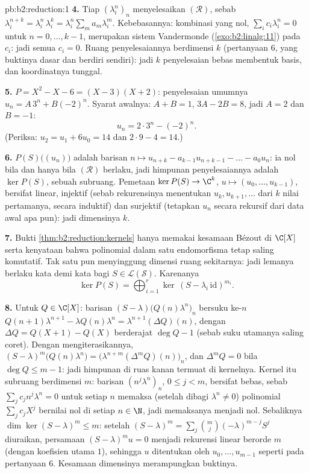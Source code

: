 \begin{solution}{pb:b2:reduction:1}
\textbf{4.} Tiap $(\lambda_i^n)_n$ menyelesaikan $(\mathcal R)$, sebab
$\lambda_i^{n+k} = \lambda_i^n\,\lambda_i^k =
\lambda_i^n\sum_m a_m\lambda_i^m$. Kebebasannya: kombinasi yang nol,
$\sum_i c_i\lambda_i^n = 0$ untuk $n = 0, \dots, k-1$,
merupakan sistem Vandermonde (\cref{exo:b2:linalg:11}) pada $c_i$:
jadi semua $c_i = 0$. Ruang penyelesaiannya berdimensi $k$ (pertanyaan 6,
yang buktinya dasar dan berdiri sendiri): jadi $k$ penyelesaian bebas
membentuk basis, dan koordinatnya tunggal.

\textbf{5.} $P = X^2 - X - 6 = (X - 3)(X + 2)$: penyelesaian umumnya
$u_n = A\,3^n + B(-2)^n$. Syarat awalnya: $A + B = 1$, $3A -
2B = 8$, jadi $A = 2$ dan $B = -1$:
\[
u_n = 2\cdot 3^n - (-2)^n .
\]
(Periksa: $u_2 = u_1 + 6u_0 = 14$ dan $2\cdot9 - 4 = 14$.)

\textbf{6.} $P(S)\bigl((u_n)\bigr)$ adalah barisan $n \mapsto
u_{n+k} - a_{k-1}u_{n+k-1} - \dots - a_0u_n$: ia nol bila dan hanya bila
$(\mathcal R)$ berlaku, jadi himpunan penyelesaiannya adalah $\ker P(S)$,
sebuah subruang. Pemetaan $\ker P(S) \to \C^k$, $u \mapsto (u_0, \dots,
u_{k-1})$, bersifat linear, injektif (sebab rekurensinya menentukan
$u_{k}, u_{k+1}, \dots$ dari $k$ nilai pertamanya, secara induktif)
dan surjektif (tetapkan $u_n$ secara rekursif dari data awal apa pun):
jadi dimensinya $k$.

\textbf{7.} Bukti \cref{thm:b2:reduction:kernels} hanya memakai
kesamaan Bézout di $\C[X]$ serta kenyataan bahwa
polinomial dalam satu endomorfisma tetap saling komutatif. Tak satu pun
menyinggung dimensi ruang sekitarnya: jadi lemanya berlaku kata demi
kata bagi $S \in \mathcal{L}(\mathcal{S})$. Karenanya
\[
\ker P(S) = \bigoplus_{i=1}^{r}
\ker\,(S - \lambda_i\,\mathrm{id})^{m_i}.
\]

\textbf{8.} Untuk $Q \in \C[X]$: barisan $(S -
\lambda)\bigl(Q(n)\lambda^n\bigr)_n$ bersuku ke-$n$
$Q(n{+}1)\lambda^{n+1} - \lambda Q(n)\lambda^n =
\lambda^{n+1}(\Delta Q)(n)$, dengan $\Delta Q = Q(X{+}1) - Q(X)$
berderajat $\deg Q - 1$ (sebab suku utamanya saling coret). Dengan
mengiterasikannya, $(S - \lambda)^m\bigl(Q(n)\lambda^n\bigr) =
\bigl(\lambda^{n+m}(\Delta^m Q)(n)\bigr)_n$, dan $\Delta^m Q = 0$
bila $\deg Q \leq m - 1$: jadi himpunan di ruas kanan termuat di
kernelnya. Kernel itu subruang berdimensi $m$: barisan
$(n^j\lambda^n)_n$, $0 \leq j < m$, bersifat bebas, sebab
$\sum_j c_j n^j\lambda^n = 0$ untuk setiap $n$ memaksa (setelah dibagi
$\lambda^n \neq 0$) polinomial $\sum_j c_jX^j$ bernilai nol di
setiap $n \in \N$, jadi memaksanya menjadi nol. Sebaliknya $\dim\ker(S -
\lambda)^m \leq m$: setelah $(S - \lambda)^m = \sum_j
\binom mj(-\lambda)^{m-j}S^j$ diuraikan, persamaan $(S - \lambda)^m u =
0$ menjadi rekurensi linear berorde $m$ (dengan koefisien utama
$1$), sehingga $u$ ditentukan oleh $u_0, \dots, u_{m-1}$ seperti pada
pertanyaan 6. Kesamaan dimensinya merampungkan buktinya.


\end{solution}
